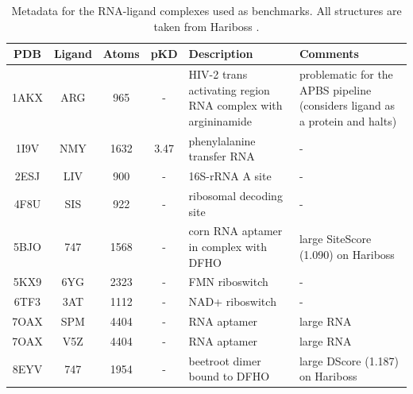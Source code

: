   \begin{table}[H]
    \caption{\label{tab:appx1/benchmark_rna} Metadata for the RNA-ligand complexes used as benchmarks. All structures are taken from Hariboss \cite{hariboss_2022}.}
    \centering
    \begin{tabular}{ccccp{1.5in}p{1.5in}}
      \hline
      PDB  & Ligand  & Atoms & pKD  & Description                                                 & Comments                                                \\ \hline
      1AKX & ARG     & 965   & -    & HIV-2 trans activating region RNA complex with argininamide & problematic for the APBS pipeline (considers ligand as a protein and halts) \\ \hline
      1I9V & NMY     & 1632  & 3.47 & phenylalanine transfer RNA                                  & -                                                       \\ \hline
      2ESJ & LIV     & 900   & -    & 16S-rRNA A site                                             & -                                                       \\ \hline
      4F8U & SIS     & 922   & -    & ribosomal decoding site                                     & -                                                       \\ \hline
      5BJO & 747     & 1568  & -    & corn RNA aptamer in complex with DFHO                       & large SiteScore (1.090) on Hariboss                     \\ \hline
      5KX9 & 6YG     & 2323  & -    & FMN riboswitch                                              & -                                                       \\ \hline
      6TF3 & 3AT     & 1112  & -    & NAD+ riboswitch                                             & -                                                       \\ \hline
      7OAX & SPM     & 4404  & -    & RNA aptamer                                                 & large RNA                                               \\ \hline
      7OAX & V5Z     & 4404  & -    & RNA aptamer                                                 & large RNA                                               \\ \hline
      8EYV & 747     & 1954  & -    & beetroot dimer bound to DFHO                                & large DScore (1.187) on Hariboss                      \\ \hline
    \end{tabular}
  \end{table}

